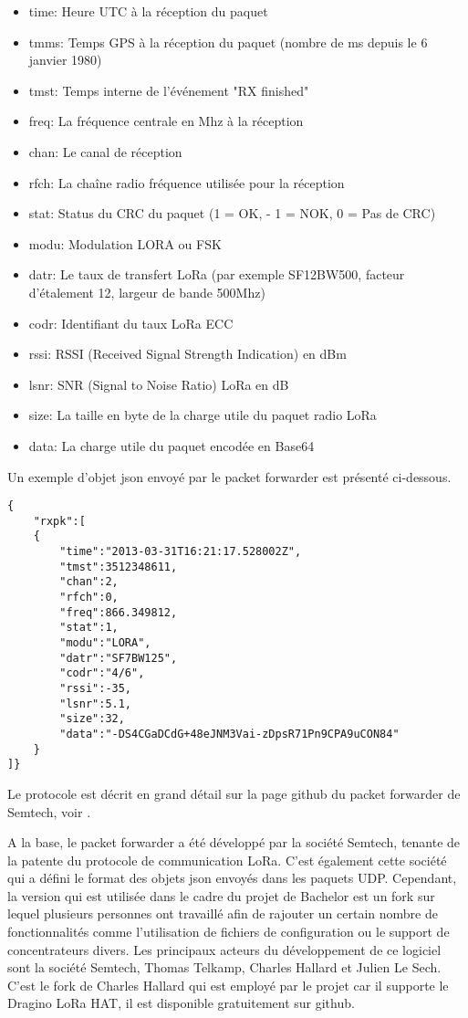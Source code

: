 \begin{itemize}
\item time: Heure UTC à la réception du paquet
\item tmms: Temps GPS à la réception du paquet (nombre de ms depuis le 6 janvier 1980)
\item tmst: Temps interne de l'événement "RX finished"
\item freq: La fréquence centrale en Mhz à la réception
\item chan: Le canal de réception
\item rfch: La chaîne radio fréquence utilisée pour la réception
\item stat: Status du CRC du paquet (1 = OK, - 1 = NOK, 0 = Pas de CRC)
\item modu: Modulation LORA ou FSK
\item datr: Le taux de transfert LoRa (par exemple SF12BW500, facteur d'étalement 12, largeur de bande 500Mhz)
\item codr: Identifiant du taux LoRa ECC
\item rssi: RSSI (Received Signal Strength Indication) en dBm
\item lsnr: SNR (Signal to Noise Ratio) LoRa en dB
\item size: La taille en byte de la charge utile du paquet radio LoRa
\item data: La charge utile du paquet encodée en Base64
\end{itemize}

Un exemple d'objet json envoyé par le packet forwarder est présenté ci-dessous.


\begin{lstlisting}
{
	"rxpk":[
	{
		"time":"2013-03-31T16:21:17.528002Z",
		"tmst":3512348611,
		"chan":2,
		"rfch":0,
		"freq":866.349812,
		"stat":1,
		"modu":"LORA",
		"datr":"SF7BW125",
		"codr":"4/6",
		"rssi":-35,
		"lsnr":5.1,
		"size":32,
		"data":"-DS4CGaDCdG+48eJNM3Vai-zDpsR71Pn9CPA9uCON84"
	}
]}
\end{lstlisting}

Le protocole est décrit en grand détail sur la page github du packet forwarder de Semtech, voir \cite{lora-pkt-forwarder-protocol}.

A la base, le packet forwarder a été développé par la société Semtech, tenante de la patente du protocole de communication LoRa. C’est également cette société qui a défini le format des objets json envoyés dans les paquets UDP. Cependant, la version qui est utilisée dans le cadre du projet de Bachelor est un fork sur lequel plusieurs personnes ont travaillé afin de rajouter un certain nombre de fonctionnalités comme l'utilisation de fichiers de configuration ou le support de concentrateurs divers. Les principaux acteurs du développement de ce logiciel sont la société Semtech, Thomas Telkamp, Charles Hallard et Julien Le Sech. C'est le fork de Charles Hallard qui est employé par le projet car il supporte le Dragino LoRa HAT, il est disponible gratuitement sur github. \cite{pkt-forwarder-hallard}

